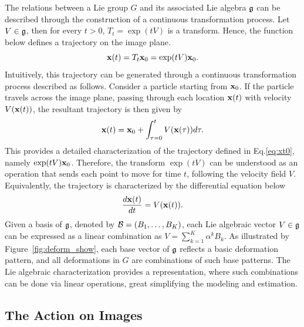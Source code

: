 The relations between a Lie group $G$ and its
associated Lie algebra $\mathfrak{g}$ can be described through the construction
of a continuous transformation process.
Let $V \in \mathfrak{g}$, then for every $t > 0$, $T_t = \exp(t V)$ is a
transform. Hence, the function below defines a trajectory on the image
plane.
\begin{equation} \label{eq:xt0}
    {\mathbf{x}}(t) = T_t {\mathbf{x}}_0 = \exp(t V) {\mathbf{x}}_0.
\end{equation}
Intuitively, this trajectory can be generated through a continuous
transformation process described as follows.
Consider a particle starting from ${\mathbf{x}}_0$. If the particle travels
across the image plane, passing through each location ${\mathbf{x}}(t)$ with
velocity $V({\mathbf{x}}(t))$, the resultant trajectory is then given by
\begin{equation}
    {\mathbf{x}}(t) = {\mathbf{x}}_0 + \int_{\tau=0}^t V({\mathbf{x}}(\tau)) d\tau.   
\end{equation}
This provides a detailed characterization of the trajectory defined in
Eq.\eqref{eq:xt0}, namely $\exp(tV) {\mathbf{x}}_0$.
Therefore, the transform $\exp(tV)$ can be understood as an operation
that sends each point to move for time $t$, following the velocity
field $V$.
Equivalently, the trajectory is characterized by the differential
equation below
\begin{equation}
    \frac{d {\mathbf{x}}(t)}{dt} = V({\mathbf{x}}(t)).
\end{equation}
%
Given a basis of $\mathfrak{g}$, denoted by $\mathcal{B} = (B_1, \ldots, B_K)$, each
Lie algebraic vector $V \in \mathfrak{g}$ can be expressed as a linear
combination as $V = \sum_{k=1}^K \alpha^k B_k$. As illustrated by
Figure~\ref{fig:deform_show}, each
base vector of $\mathfrak{g}$ reflects a basic deformation pattern, and all
deformations in $G$ are combinations of such base patterns. The Lie
algebraic characterization provides a representation, where such
combinations can be done via linear operations, great simplifying the
modeling and estimation.


\subsection{The Action on Images}

